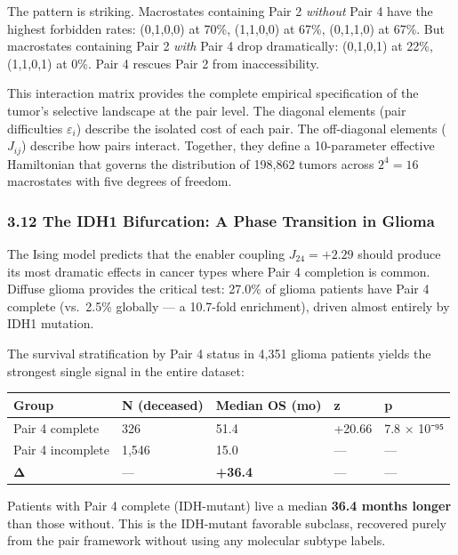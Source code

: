 \documentclass[
  11pt,
]{article}
\newcounter{none} %
\begin{document}
The pattern is striking. Macrostates containing Pair 2 \emph{without}
Pair 4 have the highest forbidden rates: (0,1,0,0) at 70\%, (1,1,0,0) at
67\%, (0,1,1,0) at 67\%. But macrostates containing Pair 2 \emph{with}
Pair 4 drop dramatically: (0,1,0,1) at 22\%, (1,1,0,1) at 0\%. Pair 4
rescues Pair 2 from inaccessibility.

This interaction matrix provides the complete empirical specification of
the tumor's selective landscape at the pair level. The diagonal elements
(pair difficulties \(\varepsilon_i\)) describe the isolated cost of each
pair. The off-diagonal elements (\(J_{ij}\)) describe how pairs
interact. Together, they define a 10-parameter effective Hamiltonian
that governs the distribution of 198,862 tumors across \(2^4 = 16\)
macrostates with five degrees of freedom.

\subsubsection{3.12 The IDH1 Bifurcation: A Phase Transition in
Glioma}\label{the-idh1-bifurcation-a-phase-transition-in-glioma}

The Ising model predicts that the enabler coupling \(J_{24} = +2.29\)
should produce its most dramatic effects in cancer types where Pair 4
completion is common. Diffuse glioma provides the critical test: 27.0\%
of glioma patients have Pair 4 complete (vs.~2.5\% globally --- a
10.7-fold enrichment), driven almost entirely by IDH1 mutation.

The survival stratification by Pair 4 status in 4,351 glioma patients
yields the strongest single signal in the entire dataset:

{\def\LTcaptype{none} %
\begin{longtable}[]{@{}lllll@{}}
\toprule\noalign{}
Group & N (deceased) & Median OS (mo) & z & p \\
\midrule\noalign{}
\endhead
\bottomrule\noalign{}
\endlastfoot
Pair 4 complete & 326 & 51.4 & +20.66 & 7.8 × 10⁻⁹⁵ \\
Pair 4 incomplete & 1,546 & 15.0 & --- & --- \\
\textbf{Δ} & --- & \textbf{+36.4} & --- & --- \\
\end{longtable}
}

Patients with Pair 4 complete (IDH-mutant) live a median \textbf{36.4
months longer} than those without. This is the IDH-mutant favorable
subclass, recovered purely from the pair framework without using any
molecular subtype labels.
\end{document}
